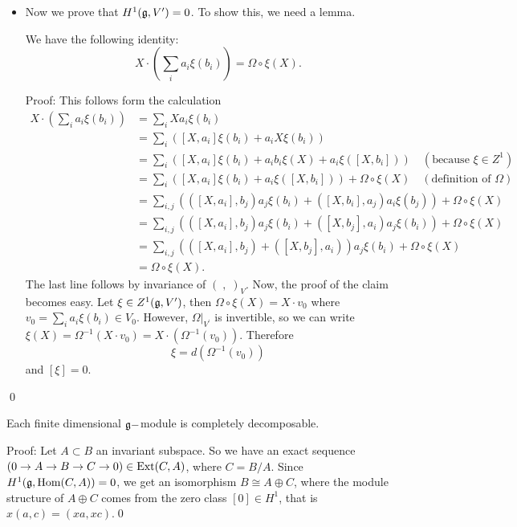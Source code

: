 \begin{itemize}
\item[4.] Now we prove that $H^1(\mathfrak{g},V^\prime)=0$. To show this, we need a lemma.
\begin{dang}
    \begin{lemma}
        We have the following identity:
        \begin{equation}
            X\cdot(\sum_i a_i\xi(b_i))=\Omega\circ \xi(X).
        \end{equation}
    \end{lemma}
\end{dang}
Proof: This follows form the calculation
\begin{equation}
    \begin{split}
         X\cdot(\sum_i a_i\xi(b_i))&=\sum_i Xa_i\xi(b_i)\\
         &=\sum_i([X,a_i]\xi(b_i)+a_iX\xi(b_i))\\
         &=\sum_i([X,a_i]\xi(b_i)+a_ib_i\xi(X)+a_i\xi([X,b_i]))\quad(\text{because }\xi\in Z^1)\\
         &=\sum_i([X,a_i]\xi(b_i)+a_i\xi([X,b_i]))+\Omega\circ\xi(X)\quad(\text{definition of }\Omega)\\
         &=\sum_{i,j}(([X,a_i],b_j)a_j\xi(b_i)+([X,b_i],a_j)a_i\xi(b_j))+\Omega\circ\xi(X)\\
         &=\sum_{i,j}(([X,a_i],b_j)a_j\xi(b_i)+([X,b_j],a_i)a_j\xi(b_i))+\Omega\circ\xi(X)\\
         &=\sum_{i,j}(([X,a_i],b_j)+([X,b_j],a_i))a_j\xi(b_i)+\Omega\circ\xi(X)\\
         &=\Omega\circ\xi(X).
    \end{split}
\end{equation}
The last line follows by invariance of $(\;,\;)_V$. Now, the proof of the claim becomes easy. Let 
$\xi\in Z^1(\mathfrak{g},V^\prime)$, then $\Omega\circ \xi(X)=X\cdot v_0$ where $v_0=\sum_i a_i\xi(b_i)\in V_0$. However, 
$\Omega|_{V^\prime}$ is invertible, so we can write $\xi(X)=\Omega^{-1}(X\cdot v_0)=X\cdot(\Omega^{-1}(v_0))$. Therefore 
\begin{equation}
    \xi = d(\Omega^{-1}(v_0))
\end{equation}
and $[\xi]=0$.
\end{itemize}
\qed
\begin{dang}
    \begin{corollary}
        Each finite dimensional $\mathfrak{g}-$module is completely decomposable.
    \end{corollary}
\end{dang}
Proof: Let $A\subset B$ an invariant subspace. So we have an exact sequence $(0\to A\to B\to C\to 0)\in \text{Ext}(C,A)$, where 
$C=B/A$. Since $H^1(\mathfrak{g},\text{Hom}(C,A))=0$, we get an isomorphism $B\cong A\oplus C$, where the module structure of 
$A\oplus C$ comes from the zero class $[0]\in H^1$, that is $x(a,c)=(xa,xc)$.\qed



